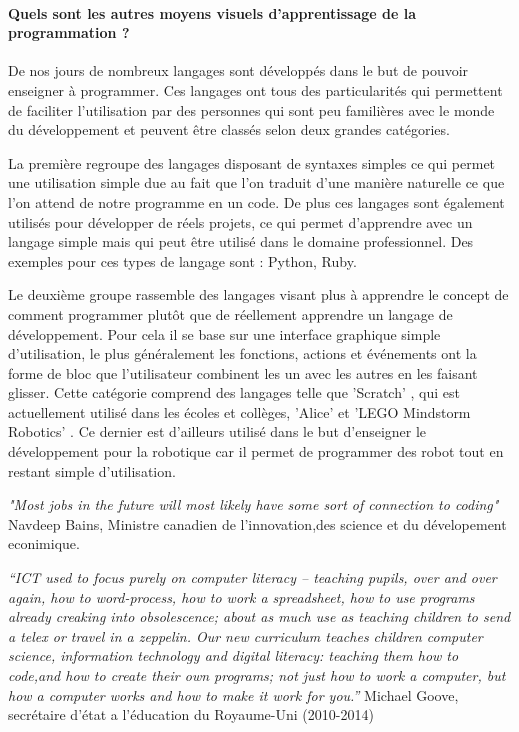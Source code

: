 \documentclass[12pt,francais]{report}
\begin{document}
\paragraph*{Quels sont les autres moyens visuels d'apprentissage de la programmation ?\\}

De nos jours de nombreux langages sont développés dans le but de pouvoir enseigner à programmer. Ces langages ont tous des particularités qui permettent de faciliter l'utilisation par des personnes qui sont peu familières avec le monde du développement et peuvent être classés selon deux grandes catégories.

La première regroupe des langages disposant de syntaxes simples ce qui permet une utilisation simple due au fait que l'on traduit d'une manière naturelle ce que l'on attend de notre programme en un code. De plus ces langages sont également utilisés pour développer de réels projets, ce qui permet d'apprendre avec un langage simple mais qui peut être utilisé dans le domaine professionnel. Des exemples pour ces types de langage sont : Python, Ruby.

Le deuxième groupe rassemble des langages visant plus à apprendre le concept de comment programmer plutôt que de réellement apprendre un langage de développement. Pour cela il se base sur une interface graphique simple d'utilisation, le plus généralement les fonctions, actions et événements ont la forme de bloc  que l'utilisateur combinent les un avec les autres en les faisant glisser. Cette catégorie comprend des langages telle que 'Scratch' \cite{ref17}, qui est actuellement utilisé dans les écoles et collèges, 'Alice' \cite{ref19} et 'LEGO Mindstorm Robotics' \cite{ref18}. Ce dernier est d'ailleurs utilisé dans le but d'enseigner le développement pour la robotique car il  permet de programmer des robot tout en restant simple d'utilisation.

\textit{"Most jobs in the future will most likely have some sort of connection to coding"}  Navdeep Bains, Ministre canadien de l'innovation,des science et du dévelopement econimique.

\textit{“ICT used to focus purely on computer literacy – teaching pupils, over and over again, how to word-process, how to work a spreadsheet, how to use programs already creaking into obsolescence; about as much use as teaching children to send a telex or travel in a zeppelin.
Our new curriculum teaches children computer science, information technology and digital literacy: teaching them how to code,and how to create their own programs; not just how to work a computer, but how a computer works and how to make it work for you.”}
Michael Goove, secrétaire d'état a l'éducation du Royaume-Uni (2010-2014) \cite{ref16}
\end{document}
